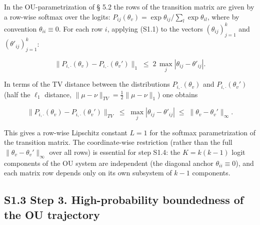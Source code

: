 \documentclass[pdflatex,sn-mathphys-ay]{sn-jnl}
\begin{document}
In the OU-parametrization of § 5.2 the rows of the transition matrix are given by a row-wise softmax over the logits: \(P_{ij}(\theta_v) = \exp \theta_{ij} / \sum_l \exp\theta_{il}\), where by convention \(\theta_{ii} \equiv 0\). For each row \(i\), applying (S1.1) to the vectors \((\theta_{ij})_{j=1}^k\) and \((\theta'_{ij})_{j=1}^k\):



\[\|P_{i,\cdot}(\theta_v) - P_{i,\cdot}(\theta_v')\|_1 \;\le\; 2 \, \max_j |\theta_{ij} - \theta'_{ij}|.\]



In terms of the TV distance between the distributions \(P_{i,\cdot}(\theta_v)\) and \(P_{i,\cdot}(\theta_v')\) (half the \(\ell_1\) distance, \(\|\mu - \nu\|_{TV} = \frac{1}{2}\|\mu - \nu\|_1\)) one obtains



\begin{equation}\|P_{i,\cdot}(\theta_v) - P_{i,\cdot}(\theta_v')\|_{TV} \;\le\; \max_j |\theta_{ij} - \theta'_{ij}| \;\le\; \|\theta_v - \theta_v'\|_\infty. \tag{S1.2}\end{equation}



This gives a row-wise Lipschitz constant \(L = 1\) for the softmax parametrization of the transition matrix. The coordinate-wise restriction (rather than the full \(\|\theta_v - \theta_v'\|_\infty\) over all rows) is essential for step S1.4: the \(K = k(k-1)\) logit components of the OU system are independent (the diagonal anchor \(\theta_{ii} \equiv 0\)), and each matrix row depends only on its own subsystem of \(k-1\) components.



\subsection*{S1.3 Step 3. High-probability boundedness of the OU trajectory}\label{s1.3-step-3.-high-probability-boundedness-of-the-ou-trajectory}
\end{document}
